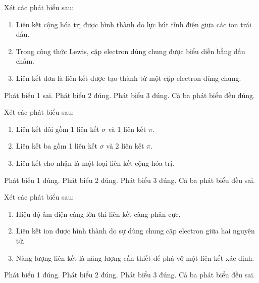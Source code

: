 \begin{ex}
	Xét các phát biểu sau:
	\begin{enumerate}
        \item Liên kết cộng hóa trị được hình thành do lực hút tĩnh điện giữa các ion trái dấu.
        \item Trong công thức Lewis, cặp electron dùng chung được biểu diễn bằng dấu chấm.
        \item Liên kết đơn là liên kết được tạo thành từ một cặp electron dùng chung.
	\end{enumerate}
	\choiceTF
	{\True Phát biểu 1 sai.}
	{Phát biểu 2 đúng.}
	{\True Phát biểu 3 đúng.}
	{Cả ba phát biểu đều đúng.}
\end{ex}

\begin{ex}
	Xét các phát biểu sau:
	\begin{enumerate}
        \item Liên kết đôi gồm 1 liên kết $\sigma$ và 1 liên kết $\pi$.
        \item Liên kết ba gồm 1 liên kết $\sigma$ và 2 liên kết $\pi$.
        \item Liên kết cho nhận là một loại liên kết cộng hóa trị.
	\end{enumerate}
	\choiceTF
	{\True Phát biểu 1 đúng.}
	{\True Phát biểu 2 đúng.}
	{\True Phát biểu 3 đúng.}
	{Cả ba phát biểu đều sai.}
\end{ex}

\begin{ex}
	Xét các phát biểu sau:
	\begin{enumerate}
        \item Hiệu độ âm điện càng lớn thì liên kết càng phân cực.
        \item Liên kết ion được hình thành do sự dùng chung cặp electron giữa hai nguyên tử.
        \item Năng lượng liên kết là năng lượng cần thiết để phá vỡ một liên kết xác định.
	\end{enumerate}
	\choiceTF
	{\True Phát biểu 1 đúng.}
	{Phát biểu 2 đúng.}
	{\True Phát biểu 3 đúng.}
	{Cả ba phát biểu đều sai.}
\end{ex}

